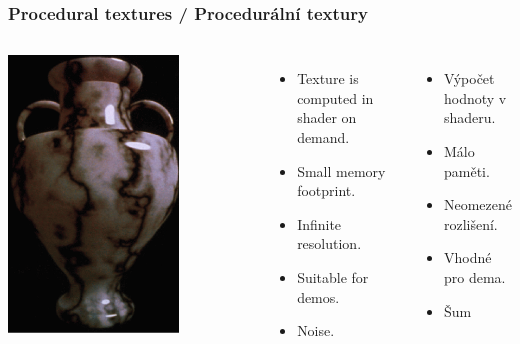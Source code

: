 \begin{frame}\frametitle{Procedural textures / Procedurální textury}
\begin{columns}[c]
  \includegraphics[width=0.7\textwidth]{pics/procedural/vase.eps}
\begin{itemize}
  \item Texture is computed in shader on demand.
  \item Small memory footprint.
  \item Infinite resolution.
  \item Suitable for demos.
  \item Noise.
\end{itemize}
\begin{itemize}
  \item Výpočet hodnoty v shaderu.
  \item Málo paměti.
  \item Neomezené rozlišení.
  \item Vhodné pro dema.
  \item Šum
\end{itemize}
\end{columns}
\end{frame}

